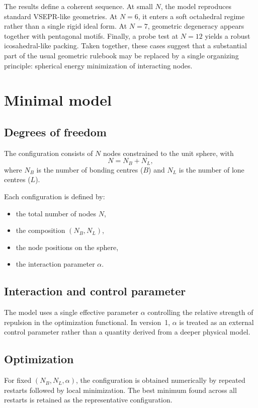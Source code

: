 \documentclass[11pt,a4paper]{article}
\begin{document}
The results define a coherent sequence. At small $N$, the model reproduces standard VSEPR-like geometries. At $N=6$, it enters a soft octahedral regime rather than a single rigid ideal form. At $N=7$, geometric degeneracy appears together with pentagonal motifs. Finally, a probe test at $N=12$ yields a robust icosahedral-like packing. Taken together, these cases suggest that a substantial part of the usual geometric rulebook may be replaced by a single organizing principle: spherical energy minimization of interacting nodes.

\section{Minimal model}

\subsection{Degrees of freedom}
The configuration consists of $N$ nodes constrained to the unit sphere, with
\[
N = N_B + N_L,
\]
where $N_B$ is the number of bonding centres ($B$) and $N_L$ is the number of lone centres ($L$).

Each configuration is defined by:
\begin{itemize}[leftmargin=1.5em]
    \item the total number of nodes $N$,
    \item the composition $(N_B, N_L)$,
    \item the node positions on the sphere,
    \item the interaction parameter $\alpha$.
\end{itemize}

\subsection{Interaction and control parameter}
The model uses a single effective parameter $\alpha$ controlling the relative strength of repulsion in the optimization functional. In version~1, $\alpha$ is treated as an external control parameter rather than a quantity derived from a deeper physical model.

\subsection{Optimization}
For fixed $(N_B, N_L, \alpha)$, the configuration is obtained numerically by repeated restarts followed by local minimization. The best minimum found across all restarts is retained as the representative configuration.
\end{document}
